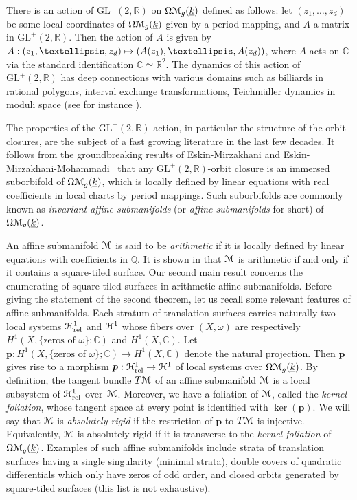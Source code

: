 \documentclass[11pt]{article}
\numberwithin{equation}{section}
\let\mathcal\EuScript
\newcommand\mto{\mathchoice{\longmapsto}{\mapsto}{\mapsto}{\mapsto}}
\newcommand{\rel}{\mathrm{rel}}
\theoremstyle{plain}
\theoremstyle{definition}
\newcommand{\R}{\mathbb{R}}
\def\C{\mathbb{C}}
\newcommand{\Q}{\mathbb{Q}}
\newcommand{\pp}{\boldsymbol{p}}
\newcommand{\Mcal}{\mathcal{M}}
\newcommand{\cH}{\mathcal{H}}
\newcommand{\cM}{\mathcal{M}}
\newcommand{\GL}{\mathrm{GL}}
\let\ul\underline
\newcommand{\trate}{\Omega\Mcal_{g}(\ul{k})}
\begin{document}
There is an action of $\GL^+(2,\R)$ on $\trate$ defined as follows: let $(z_1,\dots,z_d)$ be some local coordinates of $\trate$ given by a period mapping, and $A$ a matrix in $\GL^+(2,\R)$. Then the action of $A$ is given by $A: (z_1,\dots,z_d) \mto (A(z_1),\dots,A(z_d))$, where $A$ acts on $\C$ via the standard identification $\C\simeq \R^2$. The dynamics of this action of $\GL^+(2,\R)$ has deep connections with various domains such as billiards in rational polygons, interval exchange transformations, Teichmüller dynamics in moduli space (see for instance \cite{MaTa02, Zorich:survey}).

The properties of the $\GL^+(2,\R)$ action, in particular the structure of the orbit closures, are the subject of a fast growing literature in the last few decades. It follows from the groundbreaking results of Eskin-Mirzakhani \cite{EM18} and Eskin-Mirzakhani-Mohammadi~\cite{EMM15} that any $\GL^+(2,\R)$-orbit closure is an immersed suborbifold of $\trate$, which is locally defined by linear equations with real coefficients in local charts by period mappings. Such suborbifolds are commonly known as \emph{invariant affine submanifolds} (or \emph{affine submanifolds} for short) of $\trate$.

An affine submanifold $\cM$ is said to be \emph{arithmetic} if it is locally defined by linear equations with coefficients in $\Q$. It is shown in \cite{Wright14} that $\Mcal$ is arithmetic if and only if it contains a square-tiled surface.
Our second main result concerns the enumerating of square-tiled surfaces in arithmetic affine submanifolds.
Before giving the statement of the second theorem, let us recall some relevant features of affine submanifolds.
Each stratum of translation surfaces carries naturally two local systems $\cH^1_{\rel}$ and $\cH^1$ whose fibers over $(X,\omega)$ are respectively $H^1(X,\{\textrm{zeros of } \omega\};\C)$ and $H^1(X,\C)$. Let $\pp: H^1(X,\{\textrm{zeros of } \omega\};\C) \to H^1(X,\C)$ denote the natural projection. Then $\pp$ gives rise to a morphism $\pp: \cH^1_{\rel} \to \cH^1$ of local systems over $\trate$.
By definition, the tangent bundle $T\cM$ of an affine submanifold $\cM$ is a local subsystem of $\cH^1_{\rel}$ over~$\cM$.
Moreover, we have a foliation of $\cM$, called the \emph{kernel foliation}, whose tangent space at every point is identified with $\ker(\pp)$.
We will say that $\Mcal$ is \emph{absolutely rigid} if the restriction of $\pp$ to $T\Mcal$ is injective.
Equivalently, $\Mcal$ is absolutely rigid if it is transverse to the \emph{kernel foliation} of $\trate$.
Examples of such affine submanifolds include strata of translation surfaces having a single singularity (minimal strata), double covers of quadratic differentials which only have zeros of odd order, and closed orbits generated by square-tiled surfaces (this list is not exhaustive).
\end{document}
